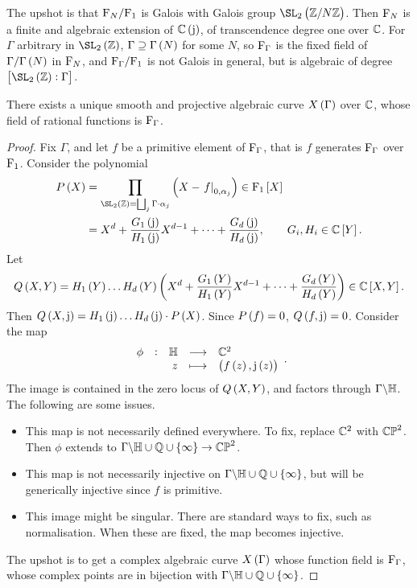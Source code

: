 The upshot is that $ \mathrm{F}_N / \mathrm{F}_1 $ is Galois with Galois group $ \SL_2\br{\ZZ / N\ZZ} $. Then $ \mathrm{F}_N $ is a finite and algebraic extension of $ \CC\br{\j} $, of transcendence degree one over $ \mathbb{C} $. For $ \Gamma $ arbitrary in $ \SL_2\br{\ZZ} $, $ \Gamma \supseteq \Gamma\br{N} $ for some $ N $, so $ \mathrm{F}_\Gamma $ is the fixed field of $ \Gamma / \Gamma\br{N} $ in $ \mathrm{F}_N $, and $ \mathrm{F}_\Gamma / \mathrm{F}_1 $ is not Galois in general, but is algebraic of degree $ \sbr{\SL_2\br{\ZZ} : \Gamma} $.

\begin{proposition}
There exists a unique smooth and projective algebraic curve $ X\br{\Gamma} $ over $ \mathbb{C} $, whose field of rational functions is $ \mathrm{F}_\Gamma $.
\end{proposition}

\begin{proof}
Fix $ \Gamma $, and let $ f $ be a primitive element of $ \mathrm{F}_\Gamma $, that is $ f $ generates $ \mathrm{F}_\Gamma $ over $ \mathrm{F}_1 $. Consider the polynomial
\begin{align*}
P\br{X}
& = \prod_{\SL_2\br{\ZZ} = \bigsqcup_j \Gamma \cdot \alpha_j} \br{X - \eval{f}_{0, \alpha_j}} \in \F_1\sbr{X} \\
& = X^d + \dfrac{G_1\br{\j}}{H_1\br{\j}}X^{d - 1} + \dots + \dfrac{G_d\br{\j}}{H_d\br{\j}}, \qquad G_i, H_i \in \CC\sbr{Y}.
\end{align*}
Let
$$ Q\br{X, Y} = H_1\br{Y} \dots H_d\br{Y}\br{X^d + \dfrac{G_1\br{Y}}{H_1\br{Y}}X^{d - 1} + \dots + \dfrac{G_d\br{Y}}{H_d\br{Y}}} \in \CC\sbr{X, Y}. $$
Then $ Q\br{X, \j} = H_1\br{\j} \dots H_d\br{\j} \cdot P\br{X} $. Since $ P\br{f} = 0 $, $ Q\br{f, \j} = 0 $. Consider the map
$$ \function[\phi]{\HH}{\CC^2}{z}{\br{f\br{z}, \j\br{z}}}. $$
The image is contained in the zero locus of $ Q\br{X, Y} $, and factors through $ \Gamma \backslash \mathbb{H} $. The following are some issues.
\begin{itemize}
\item This map is not necessarily defined everywhere. To fix, replace $ \mathbb{C}^2 $ with $ \mathbb{CP}^2 $. Then $ \phi $ extends to $ \Gamma \backslash \HH \cup \QQ \cup \cbr{\infty} \to \CP^2 $.
\item This map is not necessarily injective on $ \Gamma \backslash \HH \cup \QQ \cup \cbr{\infty} $, but will be generically injective since $ f $ is primitive.
\item This image might be singular. There are standard ways to fix, such as normalisation. When these are fixed, the map becomes injective.
\end{itemize}
The upshot is to get a complex algebraic curve $ X\br{\Gamma} $ whose function field is $ \mathrm{F}_\Gamma $, whose complex points are in bijection with $ \Gamma \backslash \HH \cup \QQ \cup \cbr{\infty} $.
\end{proof}

